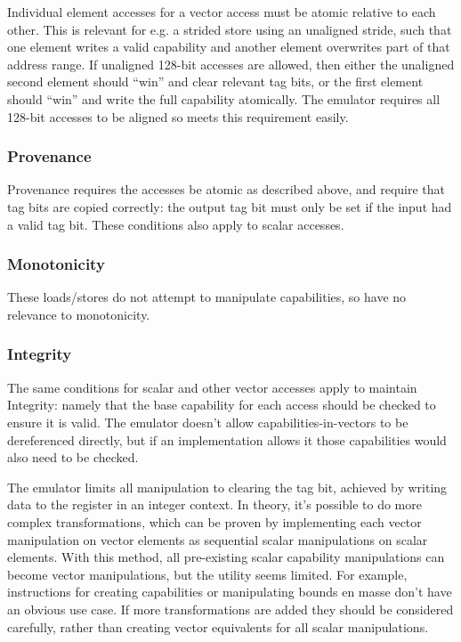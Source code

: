 Individual element accesses for a vector access must be atomic relative to each other.
This is relevant for e.g. a strided store using an unaligned stride, such that one element writes a valid capability and another element overwrites part of that address range.
If unaligned 128-bit accesses are allowed, then either the unaligned second element should ``win'' and clear relevant tag bits, or the first element should ``win'' and write the full capability atomically.
The emulator requires all 128-bit accesses to be aligned so meets this requirement easily.

\subsubsection*{Provenance}
Provenance requires the accesses be atomic as described above, and require that tag bits are copied correctly: the output tag bit must only be set if the input had a valid tag bit.
These conditions also apply to scalar accesses.

\subsubsection*{Monotonicity}
These loads/stores do not attempt to manipulate capabilities, so have no relevance to monotonicity.

\subsubsection*{Integrity}
The same conditions for scalar and other vector accesses apply to maintain Integrity: namely that the base capability for each access should be checked to ensure it is valid.
The emulator doesn't allow capabilities-in-vectors to be dereferenced directly, but if an implementation allows it those capabilities would also need to be checked.

The emulator limits all manipulation to clearing the tag bit, achieved by writing data to the register in an integer context.
In theory, it's possible to do more complex transformations, which can be proven by implementing each vector manipulation on vector elements as sequential scalar manipulations on scalar elements.
With this method, all pre-existing scalar capability manipulations can become vector manipulations, but the utility seems limited.
For example, instructions for creating capabilities or manipulating bounds en masse don't have an obvious use case.
If more transformations are added they should be considered carefully, rather than creating vector equivalents for all scalar manipulations.

